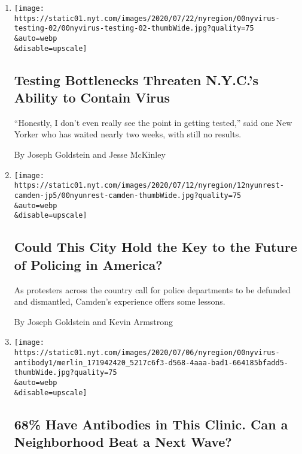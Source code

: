 \begin{enumerate}
\def\labelenumi{\arabic{enumi}.}
\item
  \href{/2020/07/23/nyregion/coronavirus-testing-nyc.html}{}

  \texttt{[image: https://static01.nyt.com/images/2020/07/22/nyregion/00nyvirus-testing-02/00nyvirus-testing-02-thumbWide.jpg?quality=75\\\&auto=webp\\\&disable=upscale]}

  \hypertarget{testing-bottlenecks-threaten-nycs-ability-to-contain-virus}{%
  \subsection{Testing Bottlenecks Threaten N.Y.C.'s Ability to Contain
  Virus}\label{testing-bottlenecks-threaten-nycs-ability-to-contain-virus}}

  ``Honestly, I don't even really see the point in getting tested,''
  said one New Yorker who has waited nearly two weeks, with still no
  results.

  By Joseph Goldstein and Jesse McKinley
\item
  \href{/2020/07/12/nyregion/camden-police.html}{}

  \texttt{[image: https://static01.nyt.com/images/2020/07/12/nyregion/12nyunrest-camden-jp5/00nyunrest-camden-thumbWide.jpg?quality=75\\\&auto=webp\\\&disable=upscale]}

  \hypertarget{could-this-city-hold-the-key-to-the-future-of-policing-in-america}{%
  \subsection{Could This City Hold the Key to the Future of Policing in
  America?}\label{could-this-city-hold-the-key-to-the-future-of-policing-in-america}}

  As protesters across the country call for police departments to be
  defunded and dismantled, Camden's experience offers some lessons.

  By Joseph Goldstein and Kevin Armstrong
\item
  \href{/2020/07/09/nyregion/nyc-coronavirus-antibodies.html}{}

  \texttt{[image: https://static01.nyt.com/images/2020/07/06/nyregion/00nyvirus-antibody1/merlin\_171942420\_5217c6f3-d568-4aaa-bad1-664185bfadd5-thumbWide.jpg?quality=75\\\&auto=webp\\\&disable=upscale]}

  \hypertarget{68-have-antibodies-in-this-clinic-can-a-neighborhood-beat-a-next-wave}{%
  \subsection{68\% Have Antibodies in This Clinic. Can a Neighborhood
  Beat a Next
  Wave?}\label{68-have-antibodies-in-this-clinic-can-a-neighborhood-beat-a-next-wave}}


\end{enumerate}
